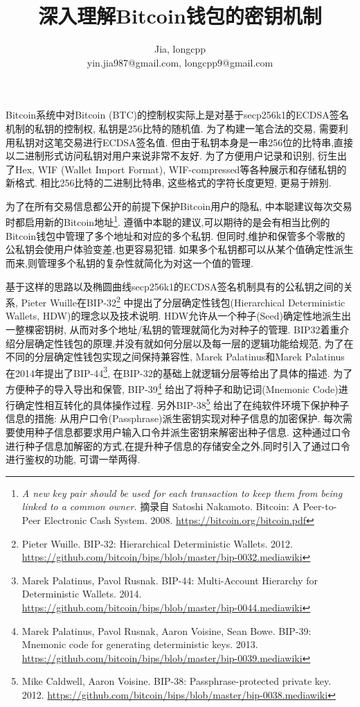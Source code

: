 \documentclass{article}
\begin{document}
\title{深入理解Bitcoin钱包的密钥机制}
\author{Jia, longcpp \\ \small{yin.jia987@gmail.com, longcpp9@gmail.com}}

\maketitle

Bitcoin系统中对Bitcoin (BTC)的控制权实际上是对基于secp256k1的ECDSA签名机制的私钥的控制权,
私钥是256比特的随机值. 为了构建一笔合法的交易, 需要利用私钥对这笔交易进行ECDSA签名值.
但由于私钥本身是一串256位的比特串,直接以二进制形式访问私钥对用户来说非常不友好.
为了方便用户记录和识别, 衍生出了Hex, WIF (Wallet Import Format), WIF-compressed等各种展示和存储私钥的新格式.
相比256比特的二进制比特串, 这些格式的字符长度更短, 更易于辨别. 

为了在所有交易信息都公开的前提下保护Bitcoin用户的隐私,
中本聪建议每次交易时都启用新的Bitcoin地址\footnote{
\textit{A new key pair should be used for each transaction to keep them from being linked to a common owner.}
摘录自 Satoshi Nakamoto. Bitcoin: A Peer-to-Peer Electronic Cash System. 2008. 
\url{https://bitcoin.org/bitcoin.pdf}}.
遵循中本聪的建议,可以期待的是会有相当比例的Bitcoin钱包中管理了多个地址和对应的多个私钥.
但同时,维护和保管多个零散的公私钥会使用户体验变差,也更容易犯错.
如果多个私钥都可以从某个值确定性派生而来,则管理多个私钥的复杂性就简化为对这一个值的管理.

基于这样的思路以及椭圆曲线secp256k1的ECDSA签名机制具有的公私钥之间的关系,
Pieter Wuille在BIP-32\footnote{
Pieter Wuille. BIP-32: Hierarchical Deterministic Wallets. 2012. 
\url{https://github.com/bitcoin/bips/blob/master/bip-0032.mediawiki}}
中提出了分层确定性钱包(Hierarchical Deterministic Wallets, HDW)的理念以及技术说明.
HDW允许从一个种子(Seed)确定性地派生出一整棵密钥树, 从而对多个地址/私钥的管理就简化为对种子的管理.
BIP32着重介绍分层确定性钱包的原理,并没有就如何分层以及每一层的逻辑功能给规范,
为了在不同的分层确定性钱包实现之间保持兼容性, Marek Palatinus和Marek Palatinus
在2014年提出了BIP-44\footnote{
Marek Palatinus, Pavol Rusnak. BIP-44: Multi-Account Hierarchy for Deterministic Wallets. 2014.
\url{https://github.com/bitcoin/bips/blob/master/bip-0044.mediawiki}},
在BIP-32的基础上就逻辑分层等给出了具体的描述.
为了方便种子的导入导出和保管, 
BIP-39\footnote{Marek Palatinus, Pavol Rusnak, Aaron Voisine, Sean Bowe. 
BIP-39: Mnemonic code for generating deterministic keys. 2013.
\url{https://github.com/bitcoin/bips/blob/master/bip-0039.mediawiki}}
给出了将种子和助记词(Mnemonic Code)进行确定性相互转化的具体操作过程.
另外BIP-38\footnote{Mike Caldwell, Aaron Voisine. BIP-38: Passphrase-protected private key. 2012.
\url{https://github.com/bitcoin/bips/blob/master/bip-0038.mediawiki}}
给出了在纯软件环境下保护种子信息的措施: 从用户口令(Passphrase)派生密钥实现对种子信息的加密保护.
每次需要使用种子信息都要求用户输入口令并派生密钥来解密出种子信息.
这种通过口令进行种子信息加解密的方式,在提升种子信息的存储安全之外,同时引入了通过口令进行鉴权的功能, 可谓一举两得.
\end{document}
